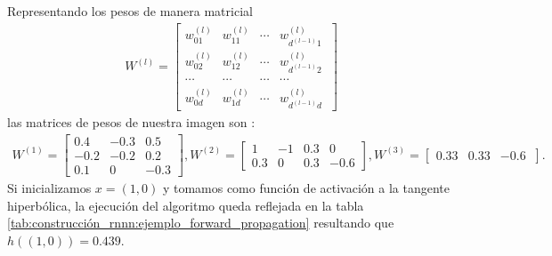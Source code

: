 Representando los pesos de manera matricial
\begin{align}
    W^{(l)} = 
    \begin{bmatrix}
        w^{(l)}_{01} & w^{(l)}_{11} & \cdots & w^{(l)}_{d^{(l-1)} 1}\\
        w^{(l)}_{02} & w^{(l)}_{12} & \cdots & w^{(l)}_{d^{(l-1)} 2}\\
        \cdots & \cdots & \cdots & \cdots \\
        w^{(l)}_{0d} & w^{(l)}_{1d} & \cdots & w^{(l)}_{d^{(l-1)} d}\
    \end{bmatrix} 
\end{align}
las matrices de pesos de nuestra imagen son :
\begin{align}
    W^{(1)} = 
    \begin{bmatrix}
        0.4 & -0.3 & 0.5\\
        -0.2 & -0.2 & 0.2\\
        0.1 & 0 & -0.3
    \end{bmatrix} ,
    W^{(2)} = 
    \begin{bmatrix}
        1 & -1 & 0.3 & 0\\
        0.3& 0 & 0.3 & -0.6 
    \end{bmatrix} ,
    W^{(3)} = 
    \begin{bmatrix}
        0.33 & 0.33 & -0.6 \
    \end{bmatrix} .
\end{align}
Si inicializamos $x= (1,0)$ y tomamos como función de activación
a la tangente hiperbólica, la ejecución del algoritmo queda reflejada en la tabla \ref{tab:construcción_rnnn:ejemplo_forward_propagation} resultando que 
$h((1,0)) = 0.439$.

